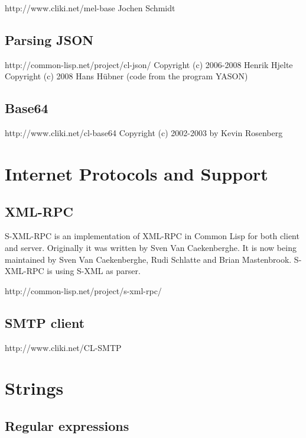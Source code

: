 \documentclass[10pt,english]{book}
\begin{document}
http://www.cliki.net/mel-base
Jochen Schmidt

\section{Parsing JSON}
\label{sec:parsing-json}

http://common-lisp.net/project/cl-json/
Copyright (c) 2006-2008 Henrik Hjelte
Copyright (c) 2008 Hans Hübner (code from the program YASON)

\section{Base64}
\label{sec:base64}

http://www.cliki.net/cl-base64
Copyright (c) 2002-2003 by Kevin Rosenberg



\chapter{Internet Protocols and Support}
\label{cha:intern-prot-supp}

\section{XML-RPC}
\label{sec:xml-rpc}

S-XML-RPC is an implementation of XML-RPC in Common Lisp for both
client and server. Originally it was written by Sven Van Caekenberghe.
It is now being maintained by Sven Van Caekenberghe, Rudi Schlatte and
Brian Mastenbrook. S-XML-RPC is using S-XML as parser.

http://common-lisp.net/project/s-xml-rpc/

\section{SMTP client}
\label{sec:smtp-client}

http://www.cliki.net/CL-SMTP



\chapter{Strings}
\label{cha:strings-1}

\section{Regular expressions}
\label{sec:regular-expressions}
\end{document}
